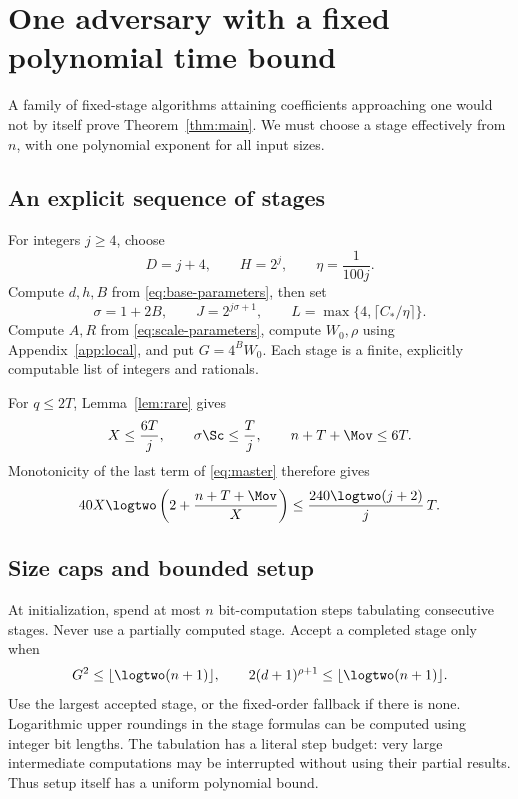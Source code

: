 \section{One adversary with a fixed polynomial time bound}
\label{sec:uniformity}

A family of fixed-stage algorithms attaining coefficients approaching one
would not by itself prove Theorem~\ref{thm:main}. We must choose a stage
effectively from $n$, with one polynomial exponent for all input sizes.

\subsection{An explicit sequence of stages}

For integers $j\geq4$, choose
\[
             D=j+4,\qquad H=2^j,\qquad \eta=\frac1{100j}.
\]
Compute $d,h,B$ from \eqref{eq:base-parameters}, then set
\[
 \sigma=1+2B,\qquad J=2^{j\sigma+1},\qquad
 L=\max\{4,\lceil C_*/\eta\rceil\}.
\]
Compute $A,R$ from \eqref{eq:scale-parameters}, compute $W_0,\rho$
using Appendix~\ref{app:local}, and put $G=4^B W_0$.
Each stage is a finite, explicitly computable list of integers and rationals.

For $q\leq2T$, Lemma~\ref{lem:rare} gives
\begin{equation}
             X\leq\frac{6T}{j},\qquad
             \sigma\Sc\leq\frac{T}{j},\qquad
             n+T+\Mov\leq6T.
\label{eq:stage-errors}
\end{equation}
Monotonicity of the last term of \eqref{eq:master} therefore gives
\begin{equation}
 40X\logtwo\left(2+\frac{n+T+\Mov}{X}\right)
           \leq\frac{240\logtwo(j+2)}j\,T.
\label{eq:stage-expensive}
\end{equation}

\subsection{Size caps and bounded setup}

At initialization, spend at most $n$ bit-computation steps tabulating
consecutive stages. Never use a partially computed stage.
Accept a completed stage only when
\begin{equation}
 G^2\leq\lfloor\logtwo(n+1)\rfloor,\qquad
 2(d+1)^{\rho+1}\leq\lfloor\logtwo(n+1)\rfloor.
\label{eq:caps}
\end{equation}
Use the largest accepted stage, or the fixed-order fallback if there is none.
Logarithmic upper roundings in the stage formulas can be computed using
integer bit lengths. The tabulation has a literal step budget: very large
intermediate computations may be interrupted without using their partial
results. Thus setup itself has a uniform polynomial bound.

